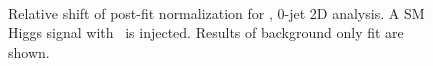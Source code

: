 \begin{figure}[!hbtp]
{}
\\
\caption{Relative shift of post-fit normalization for  \GeV, 0-jet 2D analysis.
A SM Higgs signal with  \GeV\ is injected. Results of background only fit are shown.}
\label{fig:norm_inj125_0j_125_bfit}
\end{figure}

